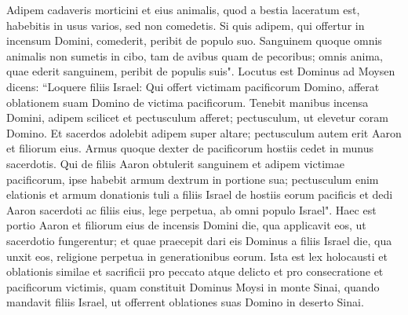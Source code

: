 \begin{biblechapter}
\verse Adipem cadaveris morticini et eius animalis, quod a bestia laceratum est, habebitis in usus varios, sed non comedetis. 
\verse Si quis adipem, qui offertur in incensum Domini, comederit, peribit de populo suo. 
\verse Sanguinem quoque omnis animalis non sumetis in cibo, tam de avibus quam de pecoribus; 
\verse omnis anima, quae ederit sanguinem, peribit de populis suis". 
\verse Locutus est Dominus ad Moysen dicens: 
\verse “Loquere filiis Israel: Qui offert victimam pacificorum Domino, afferat oblationem suam Domino de victima pacificorum. 
\verse Tenebit manibus incensa Domini, adipem scilicet et pectusculum afferet; pectusculum, ut elevetur coram Domino. 
\verse Et sacerdos adolebit adipem super altare; pectusculum autem erit Aaron et filiorum eius.  
\verse Armus quoque dexter de pacificorum hostiis cedet in munus sacerdotis. 
\verse Qui de filiis Aaron obtulerit sanguinem et adipem victimae pacificorum, ipse habebit armum dextrum in portione sua; 
\verse pectusculum enim elationis et armum donationis tuli a filiis Israel de hostiis eorum pacificis et dedi Aaron sacerdoti ac filiis eius, lege perpetua, ab omni populo Israel". 
\verse Haec est portio Aaron et filiorum eius de incensis Domini die, qua applicavit eos, ut sacerdotio fungerentur; 
\verse et quae praecepit dari eis Dominus a filiis Israel die, qua unxit eos, religione perpetua in generationibus eorum. 
\verse Ista est lex holocausti et oblationis similae et sacrificii pro peccato atque delicto et pro consecratione et pacificorum victimis, 
\verse quam constituit Dominus Moysi in monte Sinai, quando mandavit filiis Israel, ut offerrent oblationes suas Domino in deserto Sinai. 
\end{biblechapter}

